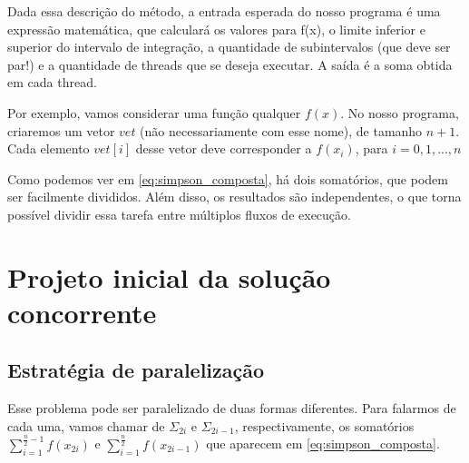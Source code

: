 \documentclass{article}
\begin{document}
Dada essa descrição do método, a entrada esperada do
nosso programa é uma expressão matemática, que calculará
os valores para f(x), o limite inferior e superior do
intervalo de integração, a quantidade de subintervalos (que
deve ser par!) e a quantidade de threads que se deseja
executar. A saída é a soma obtida em cada thread.

Por exemplo, vamos considerar uma função qualquer $f(x)$.
No nosso programa, criaremos um vetor $vet$ (não
necessariamente com esse nome), de tamanho $n + 1$.\\
Cada elemento $vet[i]$ desse vetor deve corresponder a
$f(x_i)$, para $i = 0,1,...,n$

Como podemos ver em \eqref{eq:simpson_composta}, há dois
somatórios, que podem ser facilmente divididos. Além disso,
os resultados são independentes, o que torna possível dividir
essa tarefa entre múltiplos fluxos de execução.

\section{Projeto inicial da solução concorrente}

\subsection{Estratégia de paralelização}
Esse problema pode ser paralelizado de duas formas diferentes.
Para falarmos de cada uma, vamos chamar de
$\Sigma_{2i}$ e $\Sigma_{2i-1}$, respectivamente, os somatórios
$\sum_{i=1}^{\frac{n}{2}-1}{f(x_{2i})}$ e
$\sum_{i=1}^{\frac{n}{2}}{f(x_{2i - 1})}$ que aparecem
em \eqref{eq:simpson_composta}.
\end{document}
